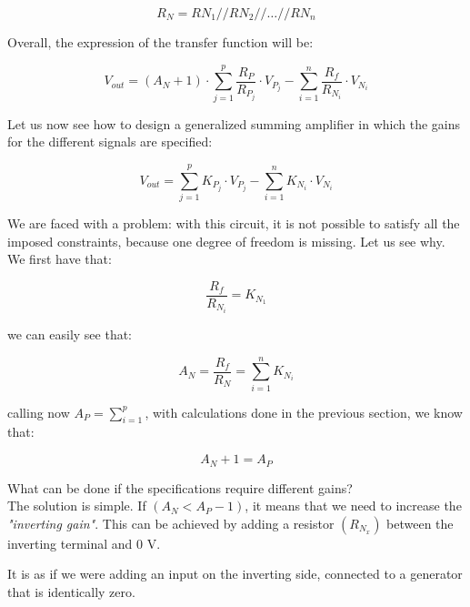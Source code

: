 \documentclass[../main.tex]{subfiles}
\begin{document}
\begin{equation}
	R_N = R{N_1} // R{N_2} // \dots // R{N_n}
\end{equation}


Overall, the expression of the transfer function will be:

\begin{equation}
	V_{out} = (A_N + 1) \cdot \sum_{j=1}^p \frac{R_P}{R_{P_j}} \cdot V_{P_j} - \sum_{i=1}^n \frac{R_f}{R_{N_i}} \cdot V_{N_i}
\end{equation}

Let us now see how to design a generalized summing amplifier in which the gains for the different signals are specified:

\begin{equation}
	V_{out} = \sum_{j=1}^p K_{P_j} \cdot V_{P_j} - \sum_{i=1}^n K_{N_i} \cdot V_{N_i}
\end{equation}

We are faced with a problem: with this circuit, it is not possible to satisfy all the imposed constraints, because one degree of freedom is missing. Let us see why.\\

We first have that:

\begin{equation}
	\frac{R_f}{R_{N_i}} = K_{N_1}
\end{equation}

we can easily see that:

\begin{equation}
	A_N = \frac{R_f}{R_N} = \sum_{i=1}^n K_{N_i}
\end{equation}

calling now $A_P = \sum_{i=1}^p$, with calculations done in the previous section, we know that:

\begin{equation}
	A_N + 1 = A_P
\end{equation}

What can be done if the specifications require different gains?\\

The solution is simple. If $(A_N < A_P - 1)$, it means that we need to increase the \textit{"inverting gain"}. This can be achieved by adding a resistor $(R_{N_x})$ between the inverting terminal and 0 V. 

It is as if we were adding an input on the inverting side, connected to a generator that is identically zero.\\
\end{document}

